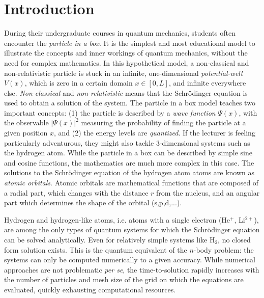 \chapter*{Introduction}

During their undergraduate courses in quantum mechanics, students often encounter the \emph{particle in a box}. It is the simplest and most educational model to illustrate the concepts and inner workings of quantum mechanics, without the need for complex mathematics. In this hypothetical model, a non-classical and non-relativistic particle is stuck in an infinite, one-dimensional \emph{potential-well} $V(x)$, which is zero in a certain domain $x \in [0,L]$, and infinite everywhere else. \emph{Non-classical} and \emph{non-relativistic} means that the Schrödinger equation is used to obtain a solution of the system. The particle in a box model teaches two important concepts: (1) the particle is described by a \emph{wave function}  $\Psi(x)$, with the observable $\left\lvert \Psi (x) \right\rvert^2$ measuring the probability of finding the particle at a given position $x$, and (2) the energy levels are \emph{quantized}. If the lecturer is feeling particularly adventurous, they might also tackle 3-dimensional systems such as the hydrogen atom. While the particle in a box can be described by simple sine and cosine functions, the mathematics are much more complex in this case. The solutions to the Schrödinger equation of the hydrogen atom atoms are known as \emph{atomic orbitals}. Atomic orbitals are mathematical functions that are composed of a radial part, which changes with the distance $r$ from the nucleus, and an angular part which determines the shape of the orbital (s,p,d,...). 

Hydrogen and hydrogen-like atoms, i.e. atoms with a single electron (He$^+$, Li$^{2+}$), are among the only types of quantum systems for which the Schrödinger equation can be solved analytically. Even for relatively simple systems like H$_2$, no closed form solution exists. This is the quantum equivalent of the $n$-body problem: the systems can only be computed numerically to a given accuracy. While numerical approaches are not problematic \emph{per se}, the time-to-solution rapidly increases with the number of particles and mesh size of the grid on which the equations are evaluated, quickly exhausting computational resources.    

